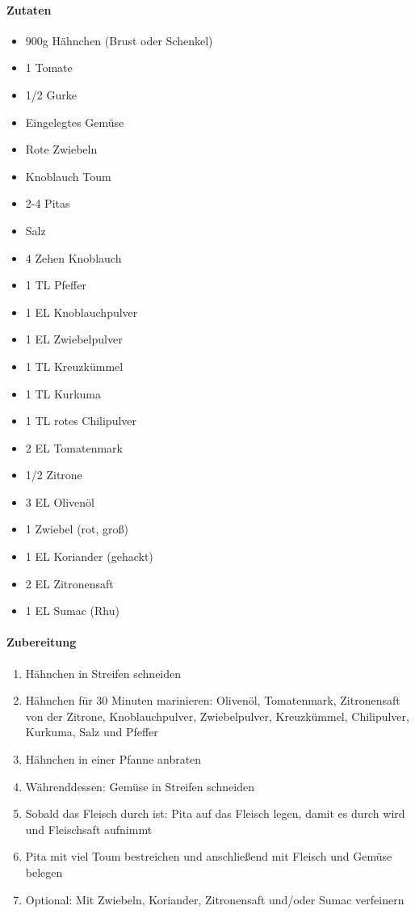 \newpage
{}

\paragraph{Zutaten}
\begin{itemize}[noitemsep]
	\item 900g Hähnchen (Brust oder Schenkel)
	\item 1 Tomate
	\item 1/2 Gurke
	\item Eingelegtes Gemüse
	\item Rote Zwiebeln
	\item Knoblauch Toum
	\item 2-4 Pitas
	\vspace{0.5cm}
	\item Salz
	\item 4 Zehen Knoblauch
	\item 1 TL Pfeffer
	\item 1 EL Knoblauchpulver
	\item 1 EL Zwiebelpulver
	\item 1 TL Kreuzkümmel
	\item 1 TL Kurkuma
	\item 1 TL rotes Chilipulver
	\item 2 EL Tomatenmark
	\item 1/2 Zitrone
	\item 3 EL Olivenöl
	\vspace{0.5cm}
	\item 1 Zwiebel (rot, groß)
	\item 1 EL Koriander (gehackt)
	\item 2 EL Zitronensaft
	\item 1 EL Sumac (Rhu)
\end{itemize}

\paragraph{Zubereitung}
\begin{enumerate}[noitemsep]
	\item Hähnchen in Streifen schneiden
	\item Hähnchen für 30 Minuten marinieren: Olivenöl, Tomatenmark, Zitronensaft von der Zitrone, Knoblauchpulver, Zwiebelpulver, Kreuzkümmel, Chilipulver, Kurkuma, Salz und Pfeffer  
	\item Hähnchen in einer Pfanne anbraten
	\item Währenddessen: Gemüse in Streifen schneiden
	\item Sobald das Fleisch durch ist: Pita auf das Fleisch legen, damit es durch wird und Fleischsaft aufnimmt
	\item Pita mit viel Toum bestreichen und anschließend mit Fleisch und Gemüse belegen
	\item Optional: Mit Zwiebeln, Koriander, Zitronensaft und/oder Sumac verfeinern
\end{enumerate}

